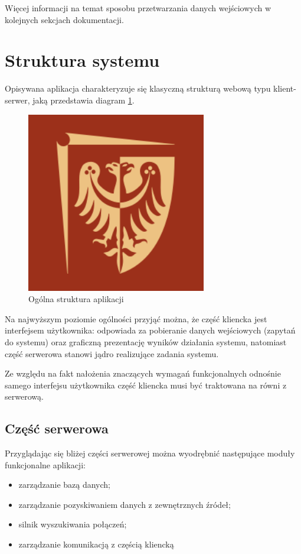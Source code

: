 \documentclass[a4paper,12pt]{article}
\begin{document}
Więcej informacji na temat sposobu przetwarzania danych wejściowych w kolejnych
sekcjach dokumentacji.

\section{Struktura systemu}

Opisywana aplikacja charakteryzuje się klasyczną strukturą webową typu
klient-serwer, jaką przedstawia diagram \ref{schemat_klient_server}.

\begin{figure}[htp]
\centering
\includegraphics[width=0.7\textwidth]{pwr}
\caption{Ogólna struktura aplikacji}\label{schemat_klient_server}
\end{figure}

Na najwyższym poziomie ogólności przyjąć można, że część kliencka jest
interfejsem użytkownika: odpowiada za pobieranie danych wejściowych (zapytań do
systemu) oraz graficzną prezentację wyników działania systemu, natomiast część
serwerowa stanowi jądro realizujące zadania systemu.

Ze względu na fakt nałożenia znaczących wymagań funkcjonalnych odnośnie samego
interfejsu użytkownika część kliencka musi być traktowana na równi z serwerową.

\subsection{Część serwerowa}
Przyglądając się bliżej części serwerowej można wyodrębnić następujące moduły
funkcjonalne aplikacji:
\begin{itemize}
  \item zarządzanie bazą danych;
  \item zarządzanie pozyskiwaniem danych z zewnętrznych źródeł;
  \item silnik wyszukiwania połączeń;
  \item zarządzanie komunikacją z częścią kliencką
\end{itemize}
\end{document}
